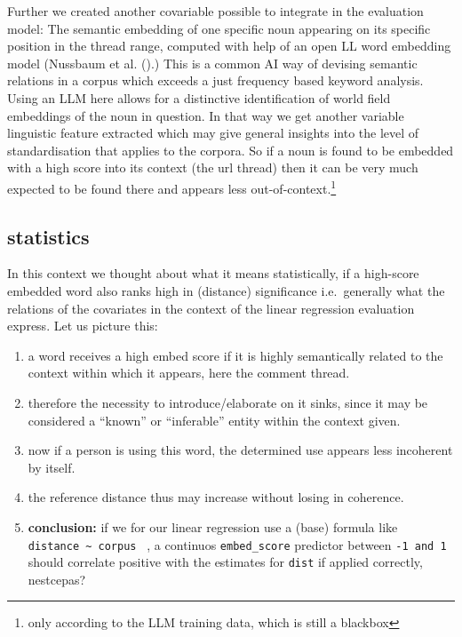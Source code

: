 \documentclass[
  12pt,
  oneside]{book}
\providecommand{\tightlist}{%
  \setlength{\itemsep}{0pt}\setlength{\parskip}{0pt}}
\begin{document}
Further we created another covariable possible to integrate in the evaluation model: The semantic embedding of one specific noun appearing on its specific position in the thread range, computed with help of an open LL word embedding model (Nussbaum et al. ().) This is a common AI way of devising semantic relations in a corpus which exceeds a just frequency based keyword analysis. Using an LLM here allows for a distinctive identification of world field embeddings of the noun in question. In that way we get another variable linguistic feature extracted which may give general insights into the level of standardisation that applies to the corpora. So if a noun is found to be embedded with a high score into its context (the url thread) then it can be very much expected to be found there and appears less out-of-context.\footnote{only according to the LLM training data, which is still a blackbox}

\subsection{statistics}\label{statistics}

In this context we thought about what it means statistically, if a high-score embedded word also ranks high in (distance) significance i.e.~generally what the relations of the covariates in the context of the linear regression evaluation express. Let us picture this:

\begin{enumerate}
\def\labelenumi{\arabic{enumi}.}
\tightlist
\item
  a word receives a high embed score if it is highly semantically related to the context within which it appears, here the comment thread.
\item
  therefore the necessity to introduce/elaborate on it sinks, since it may be considered a ``known'' or ``inferable'' entity within the context given.
\item
  now if a person is using this word, the determined use appears less incoherent by itself.
\item
  the reference distance thus may increase without losing in coherence.
\item
  \textbf{conclusion:} if we for our linear regression use a (base) formula like \texttt{distance\ \textasciitilde{}\ corpus~} , a continuos \texttt{embed\_score} predictor between \texttt{-1\ and\ 1} should correlate positive with the estimates for \texttt{dist} if applied correctly, nestcepas?
\end{enumerate}
\end{document}
